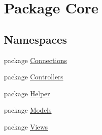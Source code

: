 \hypertarget{namespaceCore}{\section{Package Core}
\label{namespaceCore}
}
\subsection*{Namespaces}
\begin{DoxyCompactItemize}
\item 
package \hyperlink{namespaceCore_1_1Connections}{Connections}
\item 
package \hyperlink{namespaceCore_1_1Controllers}{Controllers}
\item 
package \hyperlink{namespaceCore_1_1Helper}{Helper}
\item 
package \hyperlink{namespaceCore_1_1Models}{Models}
\item 
package \hyperlink{namespaceCore_1_1Views}{Views}
\end{DoxyCompactItemize}
